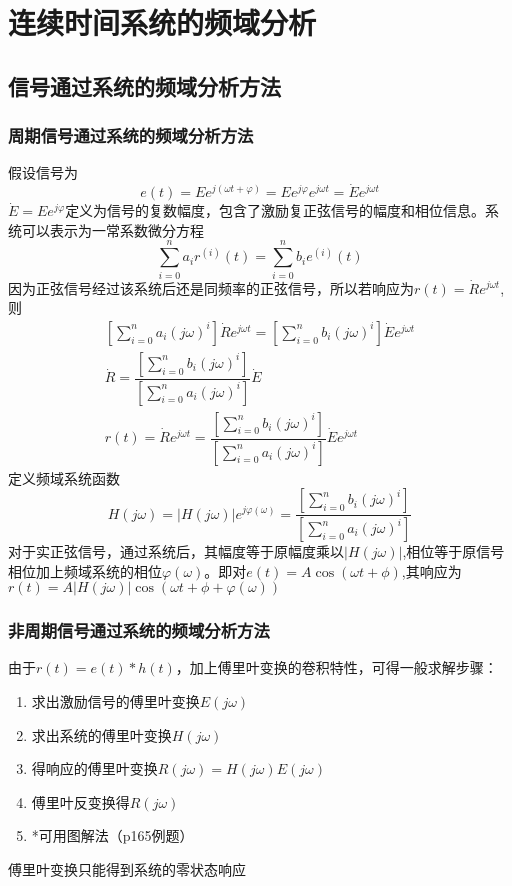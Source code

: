 \chapter{连续时间系统的频域分析}
\section{信号通过系统的频域分析方法}
\subsection{周期信号通过系统的频域分析方法}
假设信号为
\begin{equation}
    e(t)=Ee^{j(\omega t + \varphi)}=Ee^{j\varphi}e^{j\omega t}=\dot{E}e^{j\omega t}
\end{equation}
$\dot{E}=Ee^{j\varphi}$定义为信号的复数幅度，包含了激励复正弦信号的幅度和相位信息。系统可以表示为一常系数微分方程
\begin{equation}
    \sum_{i=0}^{n}a_i r^{(i)}(t)=\sum_{i=0}^{n}b_i e^{(i)}(t)
\end{equation}
因为正弦信号经过该系统后还是同频率的正弦信号，所以若响应为$r(t)=\dot{R}e^{j\omega t}$,则
\begin{align}
    \left[ \sum_{i=0}^{n}a_i (j\omega)^i \right]\dot{R}e^{j\omega t}=\left[ \sum_{i=0}^{n}b_i (j\omega)^i \right]\dot{E}e^{j\omega t}\\
    \dot{R}=\dfrac{\left[ \sum_{i=0}^{n}b_i (j\omega)^i \right]}{\left[ \sum_{i=0}^{n}a_i (j\omega)^i \right]}\dot{E}\\
    r(t)=\dot{R}e^{j\omega t}=\dfrac{\left[ \sum_{i=0}^{n}b_i (j\omega)^i \right]}{\left[ \sum_{i=0}^{n}a_i (j\omega)^i \right]}\dot{E}e^{j\omega t}
\end{align}
定义频域系统函数
\begin{equation}
    H(j\omega)=|H(j\omega)|e^{j\varphi(\omega)}=\dfrac{\left[ \sum_{i=0}^{n}b_i (j\omega)^i \right]}{\left[ \sum_{i=0}^{n}a_i (j\omega)^i \right]}
\end{equation}
对于实正弦信号，通过系统后，其幅度等于原幅度乘以$|H(j\omega)|$,相位等于原信号相位加上频域系统的相位$\varphi(\omega)$。即对$e(t)=A\cos (\omega t + \phi)$,其响应为$r(t)=A|H(j\omega)|\cos (\omega t + \phi + \varphi(\omega))$
\subsection{非周期信号通过系统的频域分析方法}
由于$r(t)=e(t)*h(t)$，加上傅里叶变换的卷积特性，可得一般求解步骤：
\begin{enumerate}
    \item 求出激励信号的傅里叶变换$E(j\omega)$
    \item 求出系统的傅里叶变换$H(j\omega)$
    \item 得响应的傅里叶变换$R(j\omega)=H(j\omega)E(j\omega)$
    \item 傅里叶反变换得$R(j\omega)$
    \item*可用图解法（p165例题）
\end{enumerate}
{\color{red}傅里叶变换只能得到系统的零状态响应}
